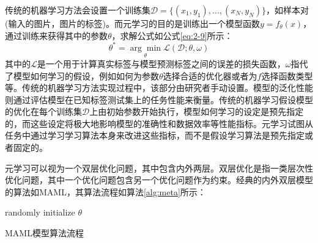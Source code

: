 传统的机器学习方法会设置一个训练集\(\mathcal{D} = \{(x_{1},y_{1}),...,(x_{N},y_{N})\}\)，如样本对(输入的图片，图片的标签)。而元学习的目的是训练出一个模型函数\(y = f_{\theta}(x)\)，通过训练来获得其中的参数\(\theta\)，求解公式如公式\ref{eq:2-9}所示：
\begin{equation}
  \theta^{*} = \underset { \theta } { \operatorname { arg } \operatorname { min } }\mathcal{L}(\mathcal{D};\theta,\omega) \label{eq:2-9}
\end{equation}
其中的\(\mathcal{L}\)是一个用于计算真实标签与模型预测标签之间的误差的损失函数，\(\omega\)指代了模型如何学习的假设，例如如何为参数\(\theta\)选择合适的优化器或者为\(f\)选择函数类型等。传统的机器学习方法实现过程中，该部分由研究者手动设置。模型的泛化性能则通过评估模型在已知标签测试集上的任务性能来衡量。传统的机器学习假设模型的优化在每个训练集\(\mathcal{D}\)上由初始参数开始执行，模型如何学习的设定是预先指定的，而这些设定将极大地影响模型的准确性和数据效率等性能指标。元学习试图从任务中通过学习学习算法本身来改进这些指标，而不是假设学习算法是预先指定或者固定的。

元学习可以视为一个双层优化问题，其中包含内外两层。双层优化\cite{stackelberg1952theory}是指一类层次性优化问题，其中一个优化问题包含另一个优化问题作为约束\cite{franceschi2018bilevel}\cite{sinha2017review}。经典的内外双层模型的算法如MAML，其算法流程如算法\ref{alg:meta}所示：
\begin{algorithm}
    randomly initialize \(\theta\) \\
  \caption{MAML模型算法流程}\label{alg:meta}
  \end{algorithm}

